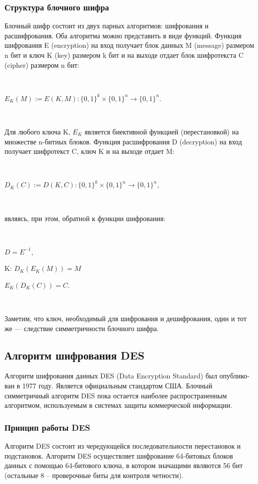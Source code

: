 \documentclass[a4paper]{report}
\begin{document}
\subsubsection{Структура блочного шифра}
Блочный шифр состоит из двух парных алгоритмов: шифрования и расшифрования. Оба алгоритма можно представить в виде функций. Функция шифрования E (encryption) на вход получает блок данных M (message) размером n бит и ключ K (key) размером k бит и на выходе отдает блок шифротекста C (cipher) размером n бит:

~

$E_K(M) := E(K,M) : \{0,1\}^k \times \{0,1\}^n \to \{0,1\}^n$.

~

Для любого ключа K, $E_K$ является биективной функцией (перестановкой) на множестве n-битных блоков. Функция расшифрования D (decryption) на вход получает шифротекст C, ключ K и на выходе отдает M:

~

$D_K(C) := D(K,C) : \{0,1\}^k \times \{0,1\}^n \to \{0,1\}^n$,

~

являясь, при этом, обратной к функции шифрования:

~

$D = E^{-1}$,
\medskip

\forall K: $D_K(E_K(M)) = M$
\medskip

$E_K(D_K(C)) = C$.

~

Заметим, что ключ, необходимый для шифрования и дешифрования, один и тот же — следствие симметричности блочного шифра.

\subsection{Алгоритм шифрования DES}
Алгоритм шифрования данных DES (Data Encryption Standard) был опублико­ван в 1977 году. Является официальным стандартом США. Блочный симметричный алгоритм DES пока остается наиболее распространенным алгоритмом, используемым в системах защиты коммерческой информации.

\subsubsection{Принцип работы DES}
Алгоритм DES состоит из чередующейся последовательности перестановок и подстановок. Алгоритм DES осуществляет шифрование 64-битовых блоков данных с помощью 64-битового ключа, в котором значащими являются 56 бит (остальные 8 – проверочные биты для контроля четности).
\end{document}

